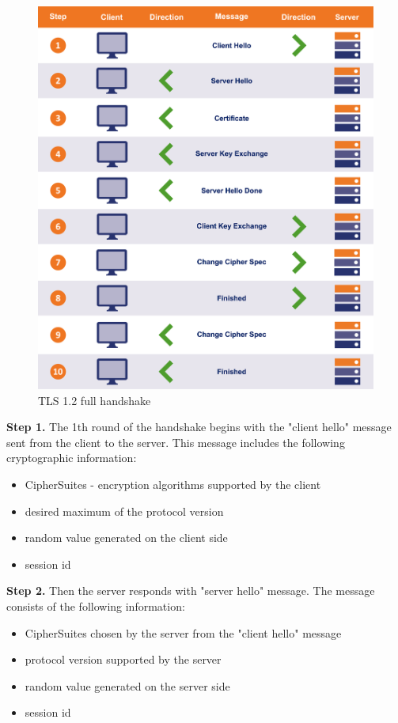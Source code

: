 \begin{figure}[H]
	\centering
		\includegraphics[scale=0.35]{images/handshake1_2.png}
	\caption{TLS 1.2 full handshake \cite{sslstore:handshake}}
	\label{fig:handshake1_2}
\end{figure}

\textbf{Step 1.} The 1th round of the handshake begins with the "client hello" message sent from the client to the server. This message includes the following cryptographic information:

\begin{itemize}
	\item CipherSuites - encryption algorithms supported by the client
	\item desired maximum of the protocol version
	\item random value generated on the client side
	\item session id
\end{itemize}

\textbf{Step 2.} Then the server responds with "server hello" message. The message consists of the following information:

\begin{itemize}
	\item CipherSuites chosen by the server from the "client hello" message
	\item protocol version supported by the server
	\item random value generated on the server side
	\item session id
\end{itemize}

